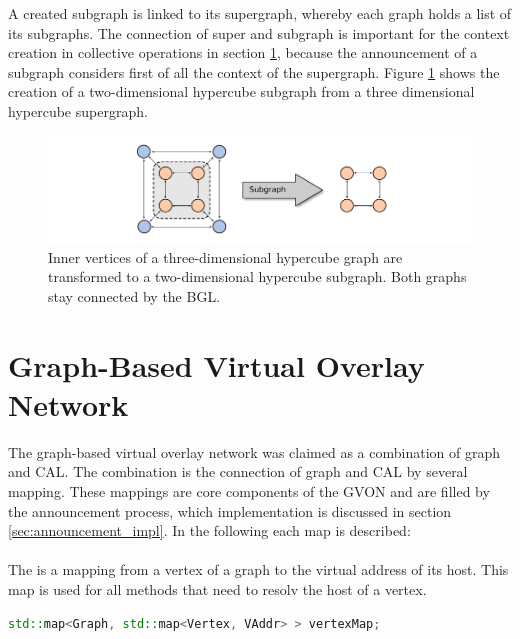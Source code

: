 A created subgraph is linked to its supergraph, whereby each graph
holds a list of its subgraphs. The connection of super and subgraph is
important for the context creation in collective operations in section
\ref{sec:gvon_impl}, because the announcement of a subgraph considers
first of all the context of the supergraph. Figure
\ref{fig:subgraph_creation} shows the creation of a two-dimensional
hypercube subgraph from a three dimensional hypercube supergraph.

\begin{figure}[H]
  \centering
  \includegraphics[width=\textwidth]{graphics/40_subgraph_creation}
  \caption{Inner vertices of a three-dimensional hypercube graph are 
  transformed to a two-dimensional hypercube subgraph. Both graphs
  stay connected by the BGL.}
  \label{fig:subgraph_creation}
\end{figure}

\section{Graph-Based Virtual Overlay Network}
\label{sec:gvon_impl}

The graph-based virtual overlay network was claimed as a combination
of graph and CAL. The combination is the connection of graph and CAL
by several mapping. These mappings are core components of the GVON and
are filled by the announcement process, which implementation is
discussed in section \ref{sec:announcement_impl}. In the following
each map is described:

\paragraph*{}
The  is a mapping from a vertex of a graph to the virtual
address of its host.  This map is used for all methods
that need to resolv the host of a vertex.
\begin{lstlisting}[language=C++, label=lst:mapping1]
std::map<Graph, std::map<Vertex, VAddr> > vertexMap;
\end{lstlisting}

